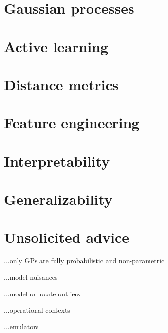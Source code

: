 \documentclass[12pt, letterpaper]{article}
\begin{document}
\section{Gaussian processes}

\section{Active learning}

\section{Distance metrics}

\section{Feature engineering}

\section{Interpretability}

\section{Generalizability}

\section{Unsolicited advice}

...only GPs are fully probabilistic and non-parametric

...model nuisances

...model or locate outliers

...operational contexts

...emulators
\end{document}
